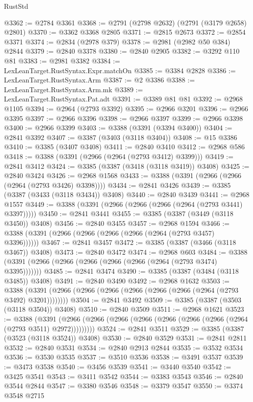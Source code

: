 \begin{lexlean}{RustStd}
\begin{coremodule}
@3362 := @2784 @3361
@3368 := @2791 (@2798 @2632) (@2791 (@3179 @2658) @2801)
@3370 := @3362 @3368 @2805
@3371 := @2815 @2673
@3372 := @2854 @3371
@3374 := @2834 (@2978 @379)
@3378 := @2981 (@2982 @50 @384) @2844
@3379 := @2840 @3378
@3380 := @2840 @2905
@3382 := @3292 @110 @81
@3383 := @2981 @3382
@3384 := LexLeanTarget.RustSyntax.Expr.matchOn
@3385 := @3384 @2828
@3386 := LexLeanTarget.RustSyntax.Arm
@3387 := @2 @3386
@3388 := LexLeanTarget.RustSyntax.Arm.mk
@3389 := LexLeanTarget.RustSyntax.Pat.adt
@3391 := @3389 @81 @81
@3392 := @2968 @1105
@3394 := @2964 (@2793 @3392)
@3395 := @2966 @3201
@3396 := @2966 @3395
@3397 := @2966 @3396
@3398 := @2966 @3397
@3399 := @2966 @3398
@3400 := @2966 @3399
@3403 := @3388 (@3391 (@3394 @3400))
@3404 := @2841 @3392
@3407 := @3387 (@3403 (@3118 @3404))
@3408 := @15 @3386
@3410 := @3385 (@3407 @3408)
@3411 := @2840 @3410
@3412 := @2968 @586
@3418 := @3388 (@3391 (@2966 (@2964 (@2793 @3412) @3399)))
@3419 := @2841 @3412
@3424 := @3385 (@3387 (@3418 (@3118 @3419)) @3408)
@3425 := @2840 @3424
@3426 := @2968 @1568
@3433 := @3388 (@3391 (@2966 (@2966 (@2964 (@2793 @3426) @3398))))
@3434 := @2841 @3426
@3439 := @3385 (@3387 (@3433 (@3118 @3434)) @3408)
@3440 := @2840 @3439
@3441 := @2968 @1557
@3449 := @3388 (@3391 (@2966 (@2966 (@2966 (@2964 (@2793 @3441) @3397)))))
@3450 := @2841 @3441
@3455 := @3385 (@3387 (@3449 (@3118 @3450)) @3408)
@3456 := @2840 @3455
@3457 := @2968 @1594
@3466 := @3388 (@3391 (@2966 (@2966 (@2966 (@2966 (@2964 (@2793 @3457) @3396))))))
@3467 := @2841 @3457
@3472 := @3385 (@3387 (@3466 (@3118 @3467)) @3408)
@3473 := @2840 @3472
@3474 := @2968 @603
@3484 := @3388 (@3391 (@2966 (@2966 (@2966 (@2966 (@2966 (@2964 (@2793 @3474) @3395)))))))
@3485 := @2841 @3474
@3490 := @3385 (@3387 (@3484 (@3118 @3485)) @3408)
@3491 := @2840 @3490
@3492 := @2968 @1632
@3503 := @3388 (@3391 (@2966 (@2966 (@2966 (@2966 (@2966 (@2966 (@2964 (@2793 @3492) @3201))))))))
@3504 := @2841 @3492
@3509 := @3385 (@3387 (@3503 (@3118 @3504)) @3408)
@3510 := @2840 @3509
@3511 := @2968 @1621
@3523 := @3388
    (@3391 (@2966 (@2966 (@2966 (@2966 (@2966 (@2966 (@2966 (@2964 (@2793 @3511) @2972)))))))))
@3524 := @2841 @3511
@3529 := @3385 (@3387 (@3523 (@3118 @3524)) @3408)
@3530 := @2840 @3529
@3531 := @2841 @2811
@3532 := @2840 @3531
@3534 := @2840 @2913 @2844
@3535 := @3532 @3534
@3536 := @3530 @3535
@3537 := @3510 @3536
@3538 := @3491 @3537
@3539 := @3473 @3538
@3540 := @3456 @3539
@3541 := @3440 @3540
@3542 := @3425 @3541
@3543 := @3411 @3542
@3544 := @3383 @3543
@3546 := @2840 @3544 @2844
@3547 := @3380 @3546
@3548 := @3379 @3547
@3550 := @3374 @3548 @2715

\end{coremodule}
\end{lexlean}
